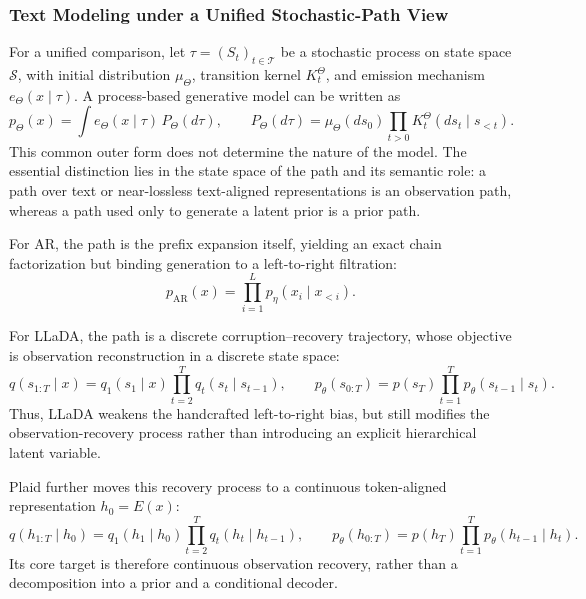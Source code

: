 \subsubsection{Text Modeling under a Unified Stochastic-Path View}

For a unified comparison, let \(\tau=(S_t)_{t\in\mathcal T}\) be a stochastic process on state space \(\mathcal S\), with initial distribution \(\mu_\Theta\), transition kernel \(K_t^\Theta\), and emission mechanism \(e_\Theta(x\mid \tau)\). A process-based generative model can be written as
\begin{equation}
p_\Theta(x)
=
\int e_\Theta(x\mid \tau)\,P_\Theta(d\tau),
\qquad
P_\Theta(d\tau)
=
\mu_\Theta(ds_0)\prod_{t>0}K_t^\Theta(ds_t\mid s_{<t}).
\label{eq:cmp_unified_path}
\end{equation}
This common outer form does not determine the nature of the model. The essential distinction lies in the state space of the path and its semantic role: a path over text or near-lossless text-aligned representations is an observation path, whereas a path used only to generate a latent prior is a prior path.

For AR, the path is the prefix expansion itself, yielding an exact chain factorization but binding generation to a left-to-right filtration:
\begin{equation}
p_{\mathrm{AR}}(x)=\prod_{i=1}^{L}p_\eta(x_i\mid x_{<i}).
\label{eq:main_ar}
\end{equation}

For LLaDA, the path is a discrete corruption--recovery trajectory, whose objective is observation reconstruction in a discrete state space:
\begin{equation}
q(s_{1:T}\mid x)=q_1(s_1\mid x)\prod_{t=2}^{T}q_t(s_t\mid s_{t-1}),
\qquad
p_\theta(s_{0:T})=p(s_T)\prod_{t=1}^{T}p_\theta(s_{t-1}\mid s_t).
\label{eq:main_llada}
\end{equation}
Thus, LLaDA weakens the handcrafted left-to-right bias, but still modifies the observation-recovery process rather than introducing an explicit hierarchical latent variable.

Plaid further moves this recovery process to a continuous token-aligned representation \(h_0=E(x)\):
\begin{equation}
q(h_{1:T}\mid h_0)=q_1(h_1\mid h_0)\prod_{t=2}^{T}q_t(h_t\mid h_{t-1}),
\qquad
p_\theta(h_{0:T})=p(h_T)\prod_{t=1}^{T}p_\theta(h_{t-1}\mid h_t).
\label{eq:main_plaid}
\end{equation}
Its core target is therefore continuous observation recovery, rather than a decomposition into a prior and a conditional decoder.

